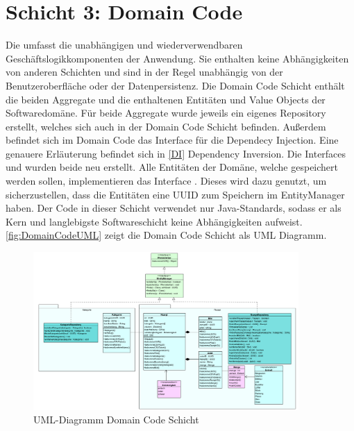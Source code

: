 \section{Schicht 3: Domain Code}
Die \href{https://github.com/MichaelaHaag/RezeptApp/tree/main/3-Domain-Code}{} umfasst die unabhängigen und wiederverwendbaren Geschäftslogikkomponenten der Anwendung. Sie enthalten keine Abhängigkeiten von anderen Schichten und sind in der Regel unabhängig von der Benutzeroberfläche oder der Datenpersistenz.
Die Domain Code Schicht enthält die beiden Aggregate und die enthaltenen Entitäten und Value Objects der Softwaredomäne. Für beide Aggregate wurde jeweils ein eigenes Repository erstellt, welches sich auch in der Domain Code Schicht befinden. Außerdem befindet sich im Domain Code das Interface \href{https://github.com/MichaelaHaag/RezeptApp/tree/main/3-Domain-Code/src/main/java/de/rezeptapp/domain/IEntityManager.java}{} für die Dependecy Injection. Eine genauere Erläuterung befindet sich in \autoref{DI} Dependency Inversion. Die Interfaces  und \href{https://github.com/MichaelaHaag/RezeptApp/tree/main/3-Domain-Code/src/main/java/de/rezeptapp/domain/IPersistierbar.java}{} wurden beide neu erstellt. Alle Entitäten der Domäne, welche gespeichert werden sollen, implementieren das Interface . Dieses wird dazu genutzt, um sicherzustellen, dass die Entitäten eine UUID zum Speichern im EntityManager haben.
Der Code in dieser Schicht verwendet nur Java-Standards, sodass er als Kern und langlebigste Softwareschicht keine Abhängigkeiten aufweist. \autoref{fig:DomainCodeUML} zeigt die Domain Code Schicht als UML Diagramm. 
\begin{figure}[ht]
	\centering
	\includegraphics[width=0.90\textwidth]{Bilder/DomainCode-UML.png} 
	\caption{UML-Diagramm Domain Code Schicht}
	\label{fig:DomainCodeUML}
\end{figure}

